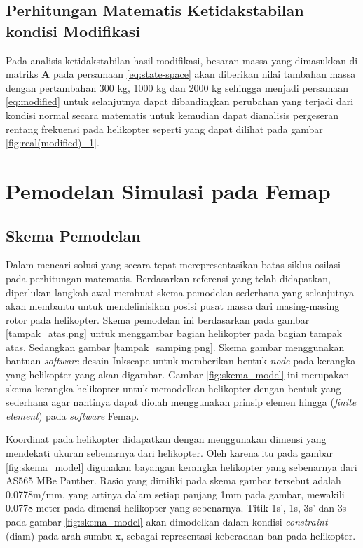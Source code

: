 \subsection{Perhitungan Matematis Ketidakstabilan kondisi Modifikasi}

Pada analisis ketidakstabilan hasil modifikasi, besaran massa yang dimasukkan di matriks \textbf{A} pada persamaan \ref{eq:state-space} akan diberikan nilai tambahan massa dengan pertambahan 300 kg, 1000 kg dan 2000 kg sehingga menjadi persamaan \ref{eq:modified} untuk selanjutnya dapat dibandingkan perubahan yang terjadi dari kondisi normal secara matematis untuk kemudian dapat dianalisis pergeseran rentang frekuensi pada helikopter seperti yang dapat dilihat pada gambar \ref{fig:real(modified)_1}.

\section{Pemodelan Simulasi pada Femap}
\label{sec:femap}

\subsection{Skema Pemodelan}



Dalam mencari solusi yang secara tepat merepresentasikan batas siklus osilasi pada perhitungan matematis. Berdasarkan referensi yang telah didapatkan, diperlukan langkah awal membuat skema pemodelan sederhana yang selanjutnya akan membantu untuk mendefinisikan posisi pusat massa dari masing-masing rotor pada helikopter. Skema pemodelan ini berdasarkan pada gambar \ref{tampak_atas.png} untuk menggambar bagian helikopter pada bagian tampak atas. Sedangkan gambar \ref{tampak_samping.png}. Skema gambar menggunakan bantuan \textit{software} desain Inkscape untuk memberikan bentuk \textit{node} pada kerangka yang helikopter yang akan digambar. Gambar \ref{fig:skema_model} ini merupakan skema kerangka helikopter untuk memodelkan helikopter dengan bentuk yang sederhana agar nantinya dapat diolah menggunakan prinsip elemen hingga (\textit{finite element}) pada \textit{software} Femap.

Koordinat pada helikopter didapatkan dengan menggunakan dimensi yang mendekati ukuran sebenarnya dari helikopter. Oleh karena itu pada gambar \ref{fig:skema_model} digunakan bayangan kerangka helikopter yang sebenarnya dari AS565 MBe Panther. Rasio yang dimiliki pada skema gambar tersebut adalah 0.0778m/mm, yang artinya dalam setiap panjang 1mm pada gambar, mewakili 0.0778 meter pada dimensi helikopter yang sebenarnya. Titik 1s', 1s, 3s' dan 3s pada gambar \ref{fig:skema_model} akan dimodelkan dalam kondisi \textit{constraint} (diam) pada arah sumbu-x, sebagai representasi keberadaan ban pada helikopter. 

